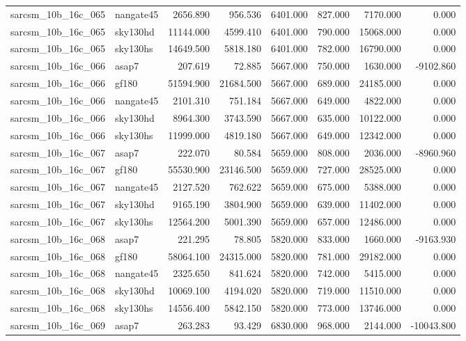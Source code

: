 \begin{tabular}{llrrrrrr}
sarcsm\_10b\_16c\_065 & nangate45 & 2656.890 & 956.536 & 6401.000 & 827.000 & 7170.000 & 0.000 \\
sarcsm\_10b\_16c\_065 & sky130hd & 11144.000 & 4599.410 & 6401.000 & 790.000 & 15068.000 & 0.000 \\
sarcsm\_10b\_16c\_065 & sky130hs & 14649.500 & 5818.180 & 6401.000 & 782.000 & 16790.000 & 0.000 \\
sarcsm\_10b\_16c\_066 & asap7 & 207.619 & 72.885 & 5667.000 & 750.000 & 1630.000 & -9102.860 \\
sarcsm\_10b\_16c\_066 & gf180 & 51594.900 & 21684.500 & 5667.000 & 689.000 & 24185.000 & 0.000 \\
sarcsm\_10b\_16c\_066 & nangate45 & 2101.310 & 751.184 & 5667.000 & 649.000 & 4822.000 & 0.000 \\
sarcsm\_10b\_16c\_066 & sky130hd & 8964.300 & 3743.590 & 5667.000 & 635.000 & 10122.000 & 0.000 \\
sarcsm\_10b\_16c\_066 & sky130hs & 11999.000 & 4819.180 & 5667.000 & 649.000 & 12342.000 & 0.000 \\
sarcsm\_10b\_16c\_067 & asap7 & 222.070 & 80.584 & 5659.000 & 808.000 & 2036.000 & -8960.960 \\
sarcsm\_10b\_16c\_067 & gf180 & 55530.900 & 23146.500 & 5659.000 & 727.000 & 28525.000 & 0.000 \\
sarcsm\_10b\_16c\_067 & nangate45 & 2127.520 & 762.622 & 5659.000 & 675.000 & 5388.000 & 0.000 \\
sarcsm\_10b\_16c\_067 & sky130hd & 9165.190 & 3804.900 & 5659.000 & 639.000 & 11402.000 & 0.000 \\
sarcsm\_10b\_16c\_067 & sky130hs & 12564.200 & 5001.390 & 5659.000 & 657.000 & 12486.000 & 0.000 \\
sarcsm\_10b\_16c\_068 & asap7 & 221.295 & 78.805 & 5820.000 & 833.000 & 1660.000 & -9163.930 \\
sarcsm\_10b\_16c\_068 & gf180 & 58064.100 & 24315.000 & 5820.000 & 781.000 & 29182.000 & 0.000 \\
sarcsm\_10b\_16c\_068 & nangate45 & 2325.650 & 841.624 & 5820.000 & 742.000 & 5415.000 & 0.000 \\
sarcsm\_10b\_16c\_068 & sky130hd & 10069.100 & 4194.020 & 5820.000 & 719.000 & 11510.000 & 0.000 \\
sarcsm\_10b\_16c\_068 & sky130hs & 14556.400 & 5842.150 & 5820.000 & 773.000 & 13746.000 & 0.000 \\
sarcsm\_10b\_16c\_069 & asap7 & 263.283 & 93.429 & 6830.000 & 968.000 & 2144.000 & -10043.800 \\

\end{tabular}
